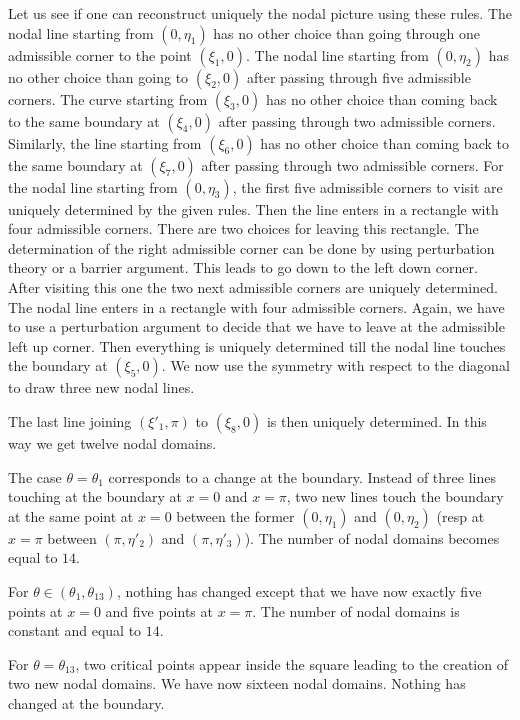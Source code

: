 \documentclass[a4paper,reqno,11pt]{amsart}
\theoremstyle{remark}
\theoremstyle{definition}
\numberwithin{equation}{section}
\begin{document}
 
Let us see if one can reconstruct uniquely  the nodal picture using these 
rules. The nodal line starting from $(0,\eta_1)$  has no other choice than going 
through one admissible corner to the point $(\xi_1,0)$. The nodal line starting 
from $(0,\eta_2)$ has no other choice than going to $(\xi_2,0)$ after passing 
through five admissible corners.  The curve starting from $(\xi_3,0)$ has no 
other choice than coming back to the same boundary at $(\xi_4,0)$ after  
passing through two admissible corners. Similarly, the line starting from 
$(\xi_6,0)$ has no other choice than coming back to the same boundary at 
$(\xi_7,0)$ after  passing through two admissible corners.  For the nodal 
line starting from $(0,\eta_3)$, the first five admissible corners to visit 
are uniquely determined by the given rules. Then the line enters in a rectangle 
with four admissible corners. There are two choices for leaving this rectangle. 
The determination of  the right admissible corner can be done by using 
perturbation theory or a barrier argument. This leads to go down to the left 
down corner. After visiting this one the two next admissible corners are 
uniquely determined. The nodal line enters in a rectangle with four admissible 
corners. Again, we have to use a perturbation argument to decide that we have 
to leave at the admissible left up corner. Then everything is uniquely 
determined till the nodal line touches the boundary at $(\xi_5,0)$. We now use 
the symmetry with respect to the diagonal to draw three new nodal lines.

The  last line joining  $(\xi'_1,\pi)$ to $(\xi_8,0)$ is then uniquely 
determined. In this way we get twelve nodal domains.

The case $\theta=\theta_1$ corresponds to a change at the boundary. Instead 
of three lines touching at the boundary at $x=0$ and $x=\pi$, 
 two new lines touch the boundary at the same point at $x=0$ between the 
former $(0,\eta_1)$ and $(0,\eta_2)$ (resp at $x=\pi$ between $(\pi,\eta'_2)$ 
and $(\pi,\eta'_3)$). The number of nodal domains becomes equal to $14$.
 
 For $\theta\in (\theta_1,\theta_{13})$, nothing has changed except that we 
have now exactly five points at $x=0$ and five points at $x=\pi$. The number of 
nodal domains is constant and equal to $14$.
 
 For $\theta = \theta_{13}$,  two critical points appear inside the square 
leading to the creation of two new nodal domains. We have now sixteen nodal 
domains. Nothing has changed at the boundary.
  
\end{document}
